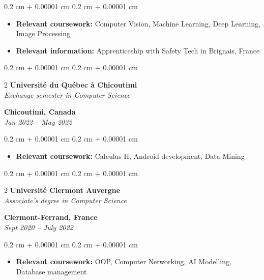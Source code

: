 \documentclass[10pt, letterpaper]{article}
\newenvironment{highlights}{
    \begin{itemize}[
        topsep=0.10 cm,
        parsep=0.10 cm,
        partopsep=0pt,
        itemsep=0pt,
        leftmargin=0.4 cm + 10pt
    ]
}{
    \end{itemize}
} %
\newenvironment{onecolentry}{
    \begin{adjustwidth}{
        0.2 cm + 0.00001 cm
    }{
        0.2 cm + 0.00001 cm
    }
}{
    \end{adjustwidth}
} %
\newenvironment{twocolentry}[2][]{
    \onecolentry
    \def\secondColumn{#2}
    \setcolumnwidth{\fill, 6 cm}
    \begin{paracol}{2}
}{
    \switchcolumn \raggedleft \secondColumn
    \end{paracol}
    \endonecolentry
} %
\begin{document}
        \begin{onecolentry}
            \begin{highlights}
                \item \textbf{Relevant coursework:} Computer Vision, Machine Learning, Deep Learning, Image Processing
                \item \textbf{Relevant information:} Apprenticeship with Safety Tech in Brignais, France
            \end{highlights}
        \end{onecolentry}

		\begin{twocolentry}{
			\textbf{Chicoutimi, Canada} \\
			\textit{Jan 2022 – May 2022}
            }{
            \textbf{Université du Québec à Chicoutimi} \\
            \textit{Exchange semester in Computer Science}
            }
        \end{twocolentry}

        \begin{onecolentry}
            \begin{highlights}
                \item \textbf{Relevant coursework:} Calculus II, Android development, Data Mining
            \end{highlights}
        \end{onecolentry}

		\begin{twocolentry}{
			\textbf{Clermont-Ferrand, France} \\
			\textit{Sept 2020 – July 2022}
            }{
            \textbf{Université Clermont Auvergne} \\
            \textit{Associate's degree in Computer Science}
            }
        \end{twocolentry}

        \begin{onecolentry}
            \begin{highlights}
                \item \textbf{Relevant coursework:} OOP, Computer Networking, AI Modelling, Database management
            \end{highlights}
        \end{onecolentry}

\end{document}
